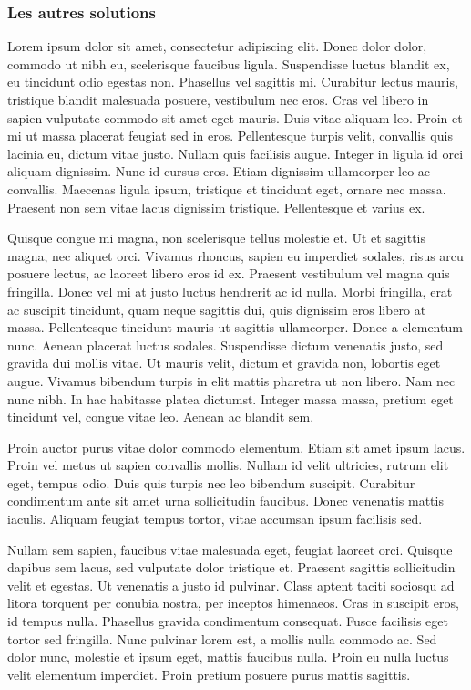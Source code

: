 \documentclass[a4paper,12pt]{report}
\begin{document}
\subsubsection{Les autres solutions} %
Lorem ipsum dolor sit amet, consectetur adipiscing elit. Donec dolor dolor, commodo ut nibh eu, scelerisque faucibus ligula. Suspendisse luctus blandit ex, eu tincidunt odio egestas non. Phasellus vel sagittis mi. Curabitur lectus mauris, tristique blandit malesuada posuere, vestibulum nec eros. Cras vel libero in sapien vulputate commodo sit amet eget mauris. Duis vitae aliquam leo. Proin et mi ut massa placerat feugiat sed in eros. Pellentesque turpis velit, convallis quis lacinia eu, dictum vitae justo. Nullam quis facilisis augue. Integer in ligula id orci aliquam dignissim. Nunc id cursus eros. Etiam dignissim ullamcorper leo ac convallis. Maecenas ligula ipsum, tristique et tincidunt eget, ornare nec massa. Praesent non sem vitae lacus dignissim tristique. Pellentesque et varius ex.

Quisque congue mi magna, non scelerisque tellus molestie et. Ut et sagittis magna, nec aliquet orci. Vivamus rhoncus, sapien eu imperdiet sodales, risus arcu posuere lectus, ac laoreet libero eros id ex. Praesent vestibulum vel magna quis fringilla. Donec vel mi at justo luctus hendrerit ac id nulla. Morbi fringilla, erat ac suscipit tincidunt, quam neque sagittis dui, quis dignissim eros libero at massa. Pellentesque tincidunt mauris ut sagittis ullamcorper. Donec a elementum nunc. Aenean placerat luctus sodales. Suspendisse dictum venenatis justo, sed gravida dui mollis vitae. Ut mauris velit, dictum et gravida non, lobortis eget augue. Vivamus bibendum turpis in elit mattis pharetra ut non libero. Nam nec nunc nibh. In hac habitasse platea dictumst. Integer massa massa, pretium eget tincidunt vel, congue vitae leo. Aenean ac blandit sem.

Proin auctor purus vitae dolor commodo elementum. Etiam sit amet ipsum lacus. Proin vel metus ut sapien convallis mollis. Nullam id velit ultricies, rutrum elit eget, tempus odio. Duis quis turpis nec leo bibendum suscipit. Curabitur condimentum ante sit amet urna sollicitudin faucibus. Donec venenatis mattis iaculis. Aliquam feugiat tempus tortor, vitae accumsan ipsum facilisis sed.

Nullam sem sapien, faucibus vitae malesuada eget, feugiat laoreet orci. Quisque dapibus sem lacus, sed vulputate dolor tristique et. Praesent sagittis sollicitudin velit et egestas. Ut venenatis a justo id pulvinar. Class aptent taciti sociosqu ad litora torquent per conubia nostra, per inceptos himenaeos. Cras in suscipit eros, id tempus nulla. Phasellus gravida condimentum consequat. Fusce facilisis eget tortor sed fringilla. Nunc pulvinar lorem est, a mollis nulla commodo ac. Sed dolor nunc, molestie et ipsum eget, mattis faucibus nulla. Proin eu nulla luctus velit elementum imperdiet. Proin pretium posuere purus mattis sagittis.
\end{document}
